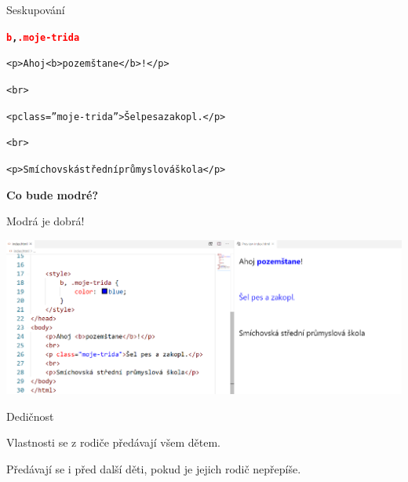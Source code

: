 \documentclass[aspectratio=169]{beamer}
\begin{document}
\begin{frame}{Seskupování}
    \begin{cardTiny}
        \begin{flushleft}
            \begin{alltt}
                \textbf{\textcolor{red}{b}, \textcolor{red}{.moje-trida}} \string{\\
                    \textcolor{blue}{color}: \textcolor{orange}{blue};\\
                \string}
            \end{alltt}
            \begin{alltt}
                <p>Ahoj <b>pozemštane</b>!</p>

                <br>
                
                <p class=''moje-trida''>Šel pes a zakopl.</p>
                
                <br>
                
                <p>Smíchovská střední průmyslová škola</p>
            \end{alltt}
        \end{flushleft}
    \end{cardTiny}
    \begin{cardTiny}
        \begin{center}
            \textbf{Co bude modré?}
        \end{center}
    \end{cardTiny}
\end{frame}

\begin{frame}{Modrá je dobrá!}
    \begin{center}
        \includegraphics[width=\textwidth]{img/html-7-8-2.png}
    \end{center}
\end{frame}

\begin{frame}{Dedičnost}
    \begin{cardTiny}
        Vlastnosti se z rodiče předávají všem dětem.

        Předávají se i před další děti, pokud je jejich rodič nepřepíše.
    \end{cardTiny}
\end{frame}
\end{document}
